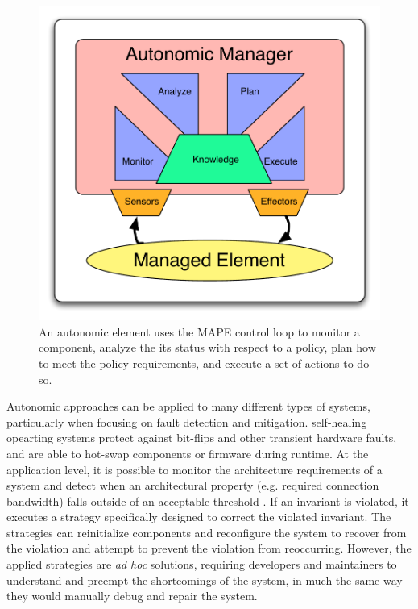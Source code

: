 \begin{figure}[tb]
  \centering
  \includegraphics[width=\columnwidth]{images/mape}
  \caption{An autonomic element uses the MAPE control loop to monitor a component, analyze the its status with respect to a policy, plan how to meet the policy requirements, and execute a set of actions to do so.}
	\label{fig:mape}
\end{figure}

Autonomic approaches can be applied to many different types of systems, particularly when focusing on fault detection and mitigation. self-healing opearting systems \cite{DBLP:journals/ibmsj/AppavooHSWSKAEGGMORSX03,4351383} protect against bit-flips and other transient hardware faults, and are able to hot-swap components or firmware during runtime. At the application level, it is possible to monitor the architecture requirements of a system and detect when an architectural property (e.g. required connection bandwidth) falls outside of an acceptable threshold \cite{Garlan2004}. If an invariant is violated, it executes a strategy specifically designed to correct the violated invariant. The strategies can reinitialize components and reconfigure the system to recover from the violation and attempt to prevent the violation from reoccurring. However, the applied strategies are \emph{ad hoc} solutions, requiring developers and maintainers to understand and preempt the shortcomings of the system, in much the same way they would manually debug and repair the system.

